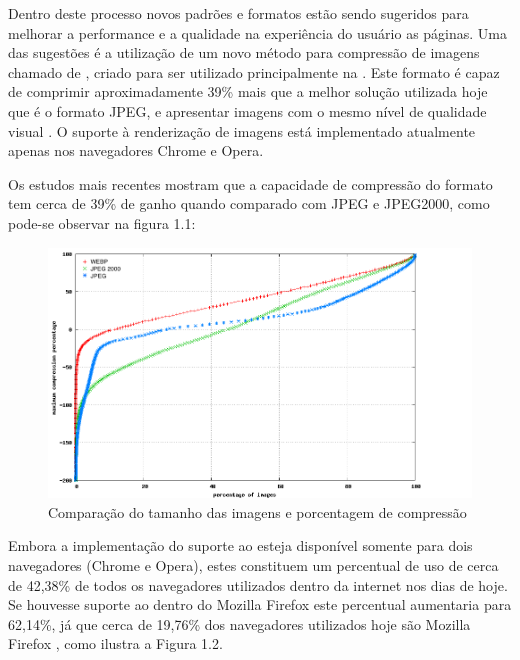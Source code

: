 \documentclass[espaco=simples,appendix=Name]{abnt}
\begin{document}
Dentro deste processo novos padrões e formatos estão sendo sugeridos para melhorar a performance e a qualidade na experiência do usuário as páginas. Uma das sugestões é a utilização de um novo método para compressão de imagens chamado de , criado para ser utilizado principalmente na . Este formato é capaz de comprimir aproximadamente 39\% mais que a melhor solução utilizada hoje que é o formato JPEG, e apresentar imagens com o mesmo nível de qualidade visual \cite{WebPStudy}. O suporte à renderização de imagens  está implementado atualmente apenas nos navegadores Chrome e Opera.

Os estudos mais recentes mostram que a capacidade de compressão do formato  tem cerca de 39\% de ganho quando comparado com JPEG e JPEG2000, como pode-se observar na figura 1.1:

\begin{figure}[h]
  \centering
    \includegraphics[scale=0.4]{Plot3_cdfcompr.png}
  \caption{Comparação do tamanho das imagens e porcentagem de compressão \protect\cite{WebPStudy}}
\end{figure}

Embora a implementação do suporte ao  esteja disponível somente para dois navegadores (Chrome e Opera), estes constituem um percentual de uso de cerca de 42,38\% de todos os navegadores utilizados dentro da internet nos dias de hoje. Se houvesse suporte ao  dentro do Mozilla Firefox este percentual aumentaria para 62,14\%, já que cerca de 19,76\% dos navegadores utilizados hoje são Mozilla Firefox \protect\cite{BrowserStats}, como ilustra a Figura 1.2.
\end{document}
